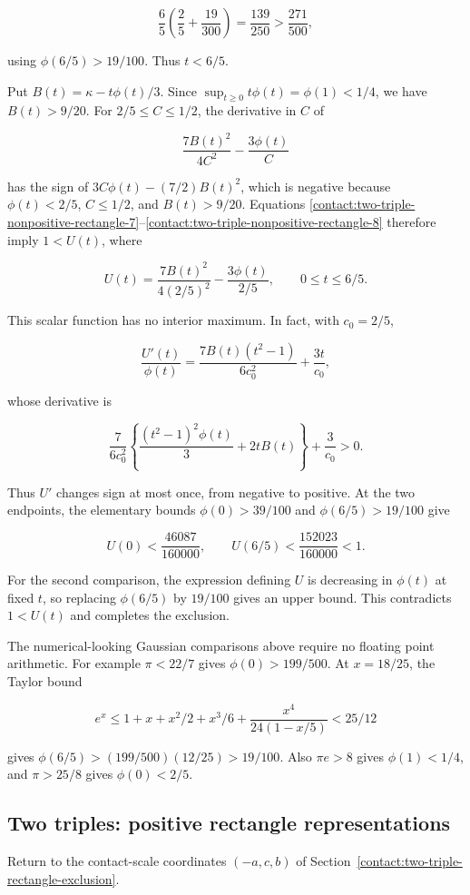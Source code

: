 \[
 \frac65\left(\frac25+\frac{19}{300}\right)
 =\frac{139}{250}>\frac{271}{500},
\]

using $\phi(6/5)>19/100$. Thus $t<6/5$.

Put $B(t)=\kappa-t \phi(t)/3$. Since
$\sup_{t\ge 0}t \phi(t)=\phi(1)<1/4$, we have $B(t)>9/20$.
For $2/5\le C\le 1/2$, the derivative in $C$ of

\[
 \frac{7B(t)^2}{4C^2}-\frac{3\phi(t)}C
\]

has the sign of $3C \phi(t)-(7/2)B(t)^2$, which is negative because
$\phi(t)<2/5$, $C\le 1/2$, and $B(t)>9/20$. Equations \eqref{contact:two-triple-nonpositive-rectangle-7}--\eqref{contact:two-triple-nonpositive-rectangle-8}
therefore imply $1<U(t)$, where

\[
 U(t)=\frac{7B(t)^2}{4(2/5)^2}-\frac{3\phi(t)}{2/5},
 \qquad 0\leq t\leq6/5.
\]

This scalar function has no interior maximum. In fact, with $c_0=2/5$,

\[
 \frac{U'(t)}{\phi(t)}
 =\frac{7B(t)(t^2-1)}{6c_0^2}+\frac{3t}{c_0},
\]

whose derivative is

\[
 \frac7{6c_0^2}
 \left\{\frac{(t^2-1)^2\phi(t)}3+2tB(t)\right\}
 +\frac3{c_0}>0.
\]

Thus $U'$ changes sign at most once, from negative to positive. At the
two endpoints, the elementary bounds $\phi(0)>39/100$ and
$\phi(6/5)>19/100$ give

\[
 U(0)<\frac{46087}{160000},\qquad
 U(6/5)<\frac{152023}{160000}<1.
\]

For the second comparison, the expression defining $U$ is decreasing in
$\phi(t)$ at fixed $t$, so replacing $\phi(6/5)$ by $19/100$ gives an
upper bound. This contradicts $1<U(t)$ and completes the exclusion.

The numerical-looking Gaussian comparisons above require no floating
point arithmetic. For example $\pi<22/7$ gives $\phi(0)>199/500$.
At $x=18/25$, the Taylor bound

\[
 e^x\leq1+x+x^2/2+x^3/6+
              \frac{x^4}{24(1-x/5)}<25/12
\]

gives $\phi(6/5)>(199/500)(12/25)>19/100$.
Also $\pi e>8$ gives $\phi(1)<1/4$, and $\pi>25/8$ gives
$\phi(0)<2/5$.
\subsection{Two triples: positive rectangle representations}\label{contact:two-triple-rectangle-exclusion-continued}
Return to the contact-scale coordinates $(-a,c,b)$ of Section~\ref{contact:two-triple-rectangle-exclusion}.



